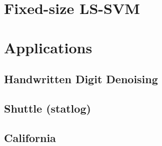 \documentclass[11pt, a4paper]{article}
\begin{document}
\section{Fixed-size LS-SVM}

\section{Applications}

\subsection{Handwritten Digit Denoising}

\subsection{Shuttle (statlog)}

\subsection{California}

% 
\end{document}

